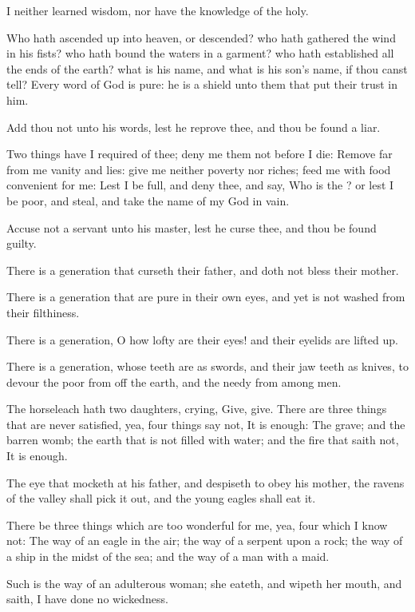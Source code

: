\verse I neither learned wisdom, nor have the knowledge of the holy.

\verse Who hath ascended up into heaven, or descended? who hath gathered the wind in his fists? who hath bound the waters in a garment? who hath established all the ends of the earth? what is his name, and what is his son's name, if thou canst tell?  \verse Every word of God is pure: he is a shield unto them that put their trust in him.

\verse Add thou not unto his words, lest he reprove thee, and thou be found a liar.

\verse Two things have I required of thee; deny me them not before I die: \verse Remove far from me vanity and lies: give me neither poverty nor riches; feed me with food convenient for me: \verse Lest I be full, and deny thee, and say, Who is the \LORD? or lest I be poor, and steal, and take the name of my God in vain.

\verse Accuse not a servant unto his master, lest he curse thee, and thou be found guilty.

\verse There is a generation that curseth their father, and doth not bless their mother.

\verse There is a generation that are pure in their own eyes, and yet is not washed from their filthiness.

\verse There is a generation, O how lofty are their eyes! and their eyelids are lifted up.

\verse There is a generation, whose teeth are as swords, and their jaw teeth as knives, to devour the poor from off the earth, and the needy from among men.

\verse The horseleach hath two daughters, crying, Give, give. There are three things that are never satisfied, yea, four things say not, It is enough: \verse The grave; and the barren womb; the earth that is not filled with water; and the fire that saith not, It is enough.

\verse The eye that mocketh at his father, and despiseth to obey his mother, the ravens of the valley shall pick it out, and the young eagles shall eat it.

\verse There be three things which are too wonderful for me, yea, four which I know not: \verse The way of an eagle in the air; the way of a serpent upon a rock; the way of a ship in the midst of the sea; and the way of a man with a maid.

\verse Such is the way of an adulterous woman; she eateth, and wipeth her mouth, and saith, I have done no wickedness.


